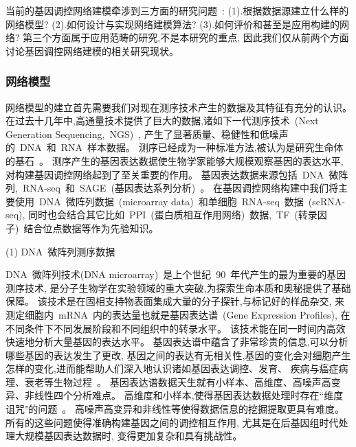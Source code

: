 当前的基因调控网络建模牵涉到三方面的研究问题~\cite{schlitt2007current}:
(1).根据数据源建立什么样的网络模型?
(2).如何设计与实现网络建模算法?
(3).如何评价和甚至是应用构建的网络?
第三个方面属于应用范畴的研究,不是本研究的重点, 因此我们仅从前两个方面讨论基因调控网络建模的相关研究现状。

\subsubsection{网络模型}

网络模型的建立首先需要我们对现在测序技术产生的数据及其特征有充分的认识。
在过去十几年中,高通量技术提供了巨大的数据,诸如下一代测序技术~(Next Generation Sequencing,~NGS)~\cite{BUERMANS20141932}, 
产生了显著质量、稳健性和低噪声的~DNA~和~RNA~样本数据。
测序已经成为一种标准方法,被认为是研究生命体的基石~\cite{CEREB2015923}。
测序产生的基因表达数据使生物学家能够大规模观察基因的表达水平, 对构建基因调控网络起到了至关重要的作用。
基因表达数据来源包括~DNA~微阵列,~RNA-seq~\cite{morin2008profiling}和~SAGE~(基因表达系列分析)~\cite{velculescu1995serial}。
在基因调控网络构建中我们将主要使用~DNA~微阵列数据~(microarray data)~和单细胞~RNA-seq~数据~(scRNA-seq),
同时也会结合其它比如~PPI~(蛋白质相互作用网络)~数据,~TF~(转录因子)~结合位点数据等作为先验知识。

(1) DNA~微阵列测序数据


DNA~微阵列技术(DNA microarray)~是上个世纪~90~年代产生的最为重要的基因测序技术,
是分子生物学在实验领域的重大突破,为探索生命本质和奥秘提供了基础保障。
该技术是在固相支持物表面集成大量的分子探针,与标记好的样品杂交,
来测定细胞内~mRNA~内的表达量也就是基因表达谱~(Gene Expression Profiles),
在不同条件下不同发展阶段和不同组织中的转录水平。
该技术能在同一时间内高效快速地分析大量基因的表达水平。
基因表达谱中蕴含了非常珍贵的信息,可以分析哪些基因的表达发生了更改, 
基因之间的表达有无相关性,基因的变化会对细胞产生怎样的变化,进而能帮助人们深入地认识诸如基因表达调控、发育、
疾病与癌症病理、衰老等生物过程~\cite{chen2005selecting,shen2009new,camargo2008identification}。
基因表达谱数据天生就有小样本、高维度、高噪声高变异、非线性四个分析难点。
高维度和小样本,使得基因表达数据处理时存在``维度诅咒"的问题~\cite{wang2006inferring}。
高噪声高变异和非线性等使得数据信息的挖掘提取更具有难度。
所有的这些问题使得准确构建基因之间的调控相互作用,
尤其是在后基因组时代处理大规模基因表达数据时,
变得更加复杂和具有挑战性。


